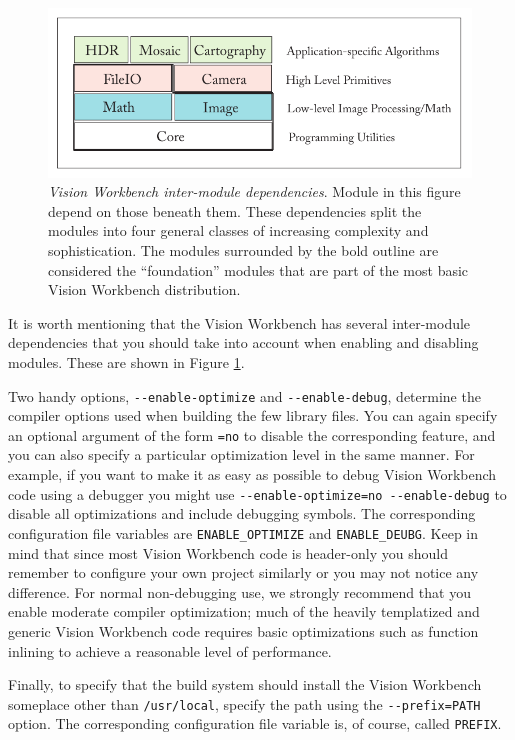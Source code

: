 \begin{figure}[bt]
\begin{center}
  \includegraphics[width=6in]{images/module_dependencies.pdf}
 \end{center}
  \label{fig:module-dependencies}
  \caption{{\em Vision Workbench inter-module dependencies}.  Module in this
    figure depend on those beneath them.  These dependencies split the
    modules into four general classes of increasing complexity and
    sophistication.  The modules surrounded by the bold outline are
    considered the ``foundation'' modules that are part of the most
    basic Vision Workbench distribution.}
\end{figure}

It is worth mentioning that the Vision Workbench has several
inter-module dependencies that you should take into account when
enabling and disabling modules.  These are shown in Figure
\ref{fig:module-dependencies}.

Two handy options, \verb#--enable-optimize# and \verb#--enable-debug#,
determine the compiler options used when building the few library
files.  You can again specify an optional argument of the form
\verb#=no# to disable the corresponding feature, and you can also
specify a particular optimization level in the same manner.  For
example, if you want to make it as easy as possible to debug Vision
Workbench code using a debugger you might use
\verb#--enable-optimize=no --enable-debug# to disable all
optimizations and include debugging symbols.  The corresponding
configuration file variables are \verb#ENABLE_OPTIMIZE# and
\verb#ENABLE_DEUBG#.  Keep in mind that since most Vision Workbench
code is header-only you should remember to configure your own project
similarly or you may not notice any difference.  For normal
non-debugging use, we strongly recommend that you enable moderate
compiler optimization; much of the heavily templatized and generic
Vision Workbench code requires basic optimizations such as function
inlining to achieve a reasonable level of performance.

Finally, to specify that the build system should install the Vision Workbench 
someplace other than \verb#/usr/local#, specify the path using the 
\verb#--prefix=PATH# option.   The corresponding configuration file 
variable is, of course, called \verb#PREFIX#.
